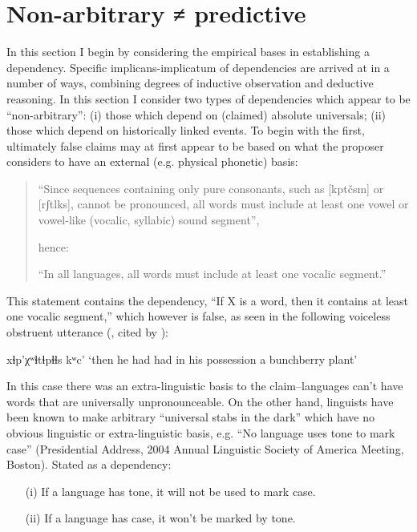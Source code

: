 \documentclass[output=paper]{langsci/langscibook}
\begin{document}
\section{Non-arbitrary ≠ predictive}

 In this section I begin by considering the empirical bases in establishing a dependency. Specific implicans-implicatum of dependencies are arrived at in a number of ways, combining degrees of inductive observation and deductive reasoning. In this section I consider two types of dependencies which appear to be “non-arbitrary”: (i) those which depend on (claimed) absolute universals; (ii) those which depend on historically linked events. To begin with the first, ultimately false claims may at first appear to be based on what the proposer considers to have an external (e.g. physical phonetic) basis:

\begin{quote}
  “Since sequences containing only pure consonants, such as [kpt\v{c}sm] or [rʃtlks], cannot be pronounced, all words must include at least one vowel or vowel-like (vocalic, syllabic) sound segment”, 
  
  hence: 
  
  “In all languages, all words must include at least one vocalic segment.”\linebreak \citep[153]{Moravcsik2013}
\end{quote}

This statement contains the dependency, “If X is a word, then it contains at least one vocalic segment,” which however is false, as seen in the following  voiceless obstruent utterance (\citealt[5]{Nater1984}, cited by \citealt[1]{Shaw2002}):

\ea
  xɬp’⁠χ⁠ʷɬtɬpɬɬs  kʷc’ 
  \glt ‘then he had had in his possession a bunchberry plant’
  \z


In this case there was an extra-linguistic basis to the claim--languages can’t have words that are universally unpronounceable. On the other hand, linguists have been known to make arbitrary “universal stabs in the dark” which have no obvious linguistic or extra-linguistic basis, e.g. “No language uses tone to mark case” (Presidential Address, 2004 Annual Linguistic Society of America Meeting, Boston). Stated as a dependency: %
\begin{itemize}
 \item[(i)] If a language has tone, it will not be used to mark case.
 \item[(ii)]  If a language has case, it won’t be marked by tone.
\end{itemize}
\end{document}
